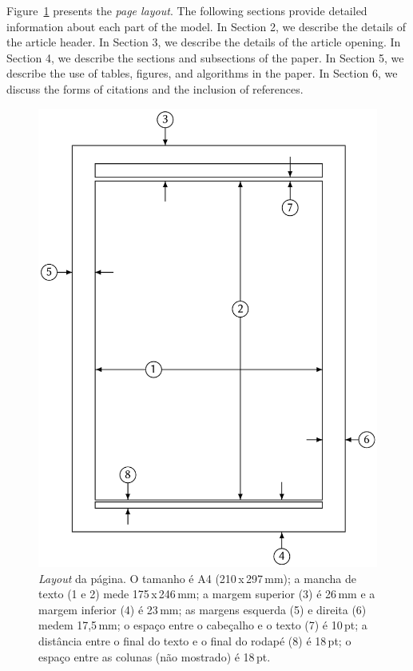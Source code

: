 \documentclass[english,notblind]{sbc20}
\begin{document}
Figure~\ref{fig:page-layout} presents the \emph{page layout}. The following sections provide detailed information about each part of the model. In Section 2, we describe the details of the article header. In Section 3, we describe the details of the article opening. In Section 4, we describe the sections and subsections of the paper. In Section 5, we describe the use of tables, figures, and algorithms in the paper. In Section 6, we discuss the forms of citations and the inclusion of references.

\begin{figure}
  \includegraphics[width=\columnwidth]{figures/page-layout}
  \caption{\emph{Layout} da página. O tamanho é A4 (210\,x\,297\,mm);
  a mancha de texto (1 e 2) mede 175\,x\,246\,mm; a margem superior
  (3) é 26\,mm e a margem inferior (4) é 23\,mm; as margens esquerda
  (5) e direita (6) medem 17,5\,mm; o espaço entre o cabeçalho e o
  texto (7) é 10\,pt; a distância entre o final do texto e o final do
  rodapé (8) é 18\,pt; o espaço entre as colunas (não mostrado) é
  18\,pt.\label{fig:page-layout}}
\end{figure}
\end{document}
